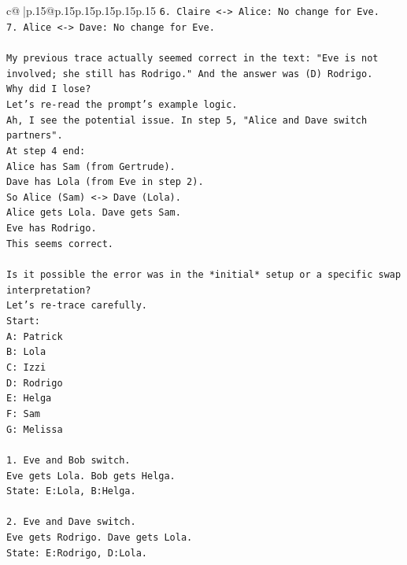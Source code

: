 \documentclass{article}
\begin{document}
{\begin{supertabular}{c@{$\;$}|p{.15\linewidth}@{}p{.15\linewidth}p{.15\linewidth}p{.15\linewidth}p{.15\linewidth}p{.15\linewidth}}
{{{\texttt{6. Claire <{-}> Alice: No change for Eve.} \\
\texttt{7. Alice <{-}> Dave: No change for Eve.} \\
\\ 
\texttt{My previous trace actually seemed correct in the text: "Eve is not involved; she still has Rodrigo." And the answer was (D) Rodrigo.} \\
\texttt{Why did I lose?} \\
\texttt{Let's re{-}read the prompt's example logic.} \\
\texttt{Ah, I see the potential issue. In step 5, "Alice and Dave switch partners".} \\
\texttt{At step 4 end:} \\
\texttt{Alice has Sam (from Gertrude).} \\
\texttt{Dave has Lola (from Eve in step 2).} \\
\texttt{So Alice (Sam) <{-}> Dave (Lola).} \\
\texttt{Alice gets Lola. Dave gets Sam.} \\
\texttt{Eve has Rodrigo.} \\
\texttt{This seems correct.} \\
\\ 
\texttt{Is it possible the error was in the *initial* setup or a specific swap interpretation?} \\
\texttt{Let's re{-}trace carefully.} \\
\texttt{Start:} \\
\texttt{A: Patrick} \\
\texttt{B: Lola} \\
\texttt{C: Izzi} \\
\texttt{D: Rodrigo} \\
\texttt{E: Helga} \\
\texttt{F: Sam} \\
\texttt{G: Melissa} \\
\\ 
\texttt{1. Eve and Bob switch.} \\
\texttt{Eve gets Lola. Bob gets Helga.} \\
\texttt{State: E:Lola, B:Helga.} \\
\\ 
\texttt{2. Eve and Dave switch.} \\
\texttt{Eve gets Rodrigo. Dave gets Lola.} \\
\texttt{State: E:Rodrigo, D:Lola.} \\
\\ 
}}}
\end{supertabular}}
\end{document}
